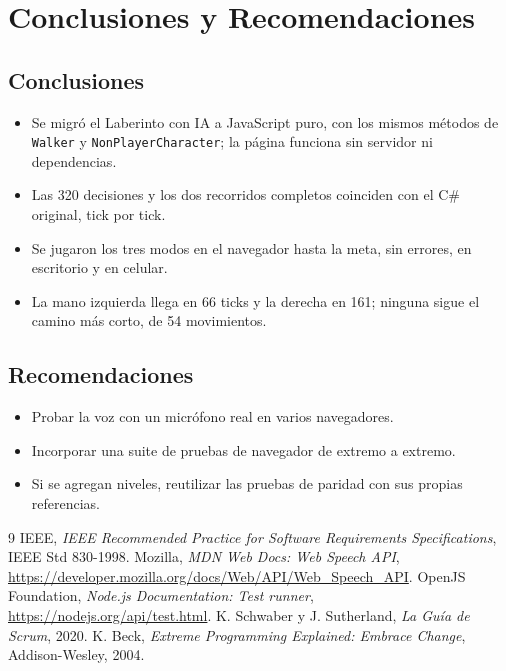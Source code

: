 \documentclass[12pt,a4paper]{article}
\begin{document}
\section{Conclusiones y Recomendaciones}
\subsection{Conclusiones}
\begin{itemize}
 \item Se migró el Laberinto con IA a JavaScript puro, con los mismos métodos de
       \texttt{Walker} y \texttt{NonPlayerCharacter}; la página funciona sin
       servidor ni dependencias.
 \item Las 320 decisiones y los dos recorridos completos coinciden con el C\#
       original, tick por tick.
 \item Se jugaron los tres modos en el navegador hasta la meta, sin errores, en
       escritorio y en celular.
 \item La mano izquierda llega en 66 ticks y la derecha en 161; ninguna sigue el
       camino más corto, de 54 movimientos.
\end{itemize}

\subsection{Recomendaciones}
\begin{itemize}
 \item Probar la voz con un micrófono real en varios navegadores.
 \item Incorporar una suite de pruebas de navegador de extremo a extremo.
 \item Si se agregan niveles, reutilizar las pruebas de paridad con sus propias referencias.
\end{itemize}

\begin{thebibliography}{9}
 IEEE, \emph{IEEE Recommended Practice for Software Requirements Specifications}, IEEE Std 830-1998.
 Mozilla, \emph{MDN Web Docs: Web Speech API}, \url{https://developer.mozilla.org/docs/Web/API/Web_Speech_API}.
 OpenJS Foundation, \emph{Node.js Documentation: Test runner}, \url{https://nodejs.org/api/test.html}.
 K. Schwaber y J. Sutherland, \emph{La Guía de Scrum}, 2020.
 K. Beck, \emph{Extreme Programming Explained: Embrace Change}, Addison-Wesley, 2004.
\end{thebibliography}
\end{document}
